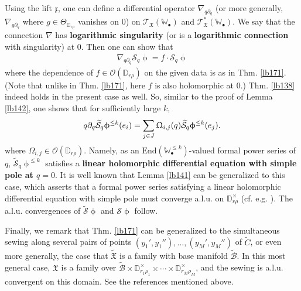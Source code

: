 \documentclass[12pt,a4paper,notitlepage]{article}
\theoremstyle{definition}
\theoremstyle{plain}
\newcommand{\fk}{\mathfrak}
\newcommand{\mc}{\mathcal}
\newcommand{\wtd}{\widetilde}
\newcommand{\End}{\mathrm{End}} %
\newcommand{\scr}{\mathscr}
\newcommand{\xk}{\mathfrak x}
\newcommand{\blt}{\bullet}
\newcommand{\Wbb}{\mathbb W}
\newcommand{\Dbb}{\mathbb D}
\numberwithin{equation}{section}
\begin{document}
Using the lift $\xk$, one can define a differential operator $\nabla_{q\partial_q}$ (or more generally, $\nabla_{g\partial_q}$ where $g\in\Theta_{\Dbb_{r\rho}}$ vanishes on $0$) on $\scr T_{\fk X}(\Wbb_\blt)$ and $\scr T_{\fk X}^*(\Wbb_\blt)$. We say that the connection $\nabla$ has \textbf{logarithmic singularity} (or is a \textbf{logarithmic connection} with singularity) at $0$. Then one can show  that
\begin{align}
\nabla_{q\partial_q}\mc S_q\upphi=f\cdot\mc S_q\upphi
\end{align}
where the dependence of $f\in\scr O(\Dbb_{r\rho})$ on the given data is as in Thm. \ref{lb171}. (Note that unlike in Thm. \ref{lb171},  here $f$ is also holomorphic at $0$.) Thm. \ref{lb138} indeed holds in the present case as well. So, similar to the proof of Lemma \ref{lb142}, one shows that for sufficiently large $k$,
\begin{align}
q\partial_q\wtd{\mc S}_q\upphi^{\leq k}(e_i)=\sum_{j\in J}\Upomega_{i,j}(q)\wtd{\mc S}_q\upphi^{\leq k}(e_j).\label{eq253}
\end{align}
where $\Omega_{i,j}\in\scr O(\Dbb_{r\rho})$. Namely, as an $\End(\Wbb_\blt^{\leq k})$-valued formal power series of $q$, $\wtd{\mc S}_q\upphi^{\leq k}$ satisfies a \textbf{linear holomorphic differential equation with simple pole at $q=0$}. It is well known that Lemma \ref{lb141} can be generalized to this case, which asserts that a formal power series satisfying a linear holomorphic differential equation with simple pole must converge a.l.u. on $\Dbb_{r\rho}^\times$ (cf. e.g. \cite[Sec. 1.7]{Gui}). The a.l.u. convergences of $\wtd{\mc S}\upphi$ and $\mc S\upphi$ follow. 

Finally, we remark that Thm. \ref{lb171} can be generalized to the simultaneous sewing along several pairs of points $(y_1',y_1''),\dots,(y_M',y_M'')$ of $\wtd C$, or even more generally, the case that $\wtd {\fk X}$ is a family with base manifold $\wtd{\mc B}$. In this most general case, $\fk X$ is a family over $\wtd{\mc B}\times\Dbb^\times_{r_1\rho_1}\times\cdots\times\Dbb^\times_{r_M\rho_M}$, and the sewing is a.l.u. convergent on this domain. See the references mentioned above.




\subsection{}
\end{document}
